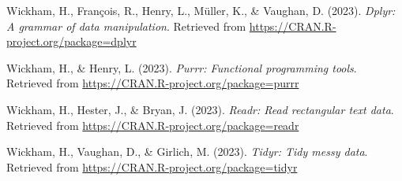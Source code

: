 \documentclass[
  man]{apa6}
\newlength{\cslhangindent}
\newenvironment{CSLReferences}[2] %
 {\begin{list}{}{%
  \setlength{\itemindent}{0pt}
  \setlength{\leftmargin}{0pt}
  \setlength{\parsep}{0pt}
  \ifodd #1
   \setlength{\leftmargin}{\cslhangindent}
   \setlength{\itemindent}{-1\cslhangindent}
  \fi
  \setlength{\itemsep}{#2\baselineskip}}}
 {\end{list}}
\begin{document}
\begin{CSLReferences}{1}{0}
Wickham, H., François, R., Henry, L., Müller, K., \& Vaughan, D. (2023). \emph{Dplyr: A grammar of data manipulation}. Retrieved from \url{https://CRAN.R-project.org/package=dplyr}

Wickham, H., \& Henry, L. (2023). \emph{Purrr: Functional programming tools}. Retrieved from \url{https://CRAN.R-project.org/package=purrr}

Wickham, H., Hester, J., \& Bryan, J. (2023). \emph{Readr: Read rectangular text data}. Retrieved from \url{https://CRAN.R-project.org/package=readr}

Wickham, H., Vaughan, D., \& Girlich, M. (2023). \emph{Tidyr: Tidy messy data}. Retrieved from \url{https://CRAN.R-project.org/package=tidyr}

\end{CSLReferences}
\end{document}
